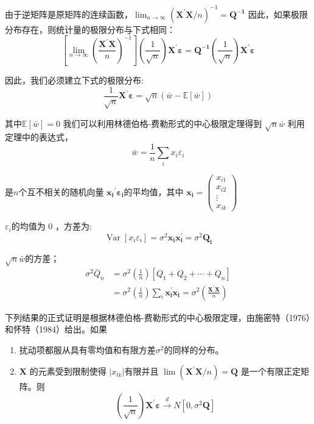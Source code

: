 由于逆矩阵是原矩阵的连续函数，$ \lim _{n \rightarrow \infty}\left(  \boldsymbol{X^{\prime} X} / n\right)^{-1}=  \boldsymbol{Q^{-1}} $ 
因此，如果极限分布存在，则统计量的极限分布与下式相同：
\begin{equation}
    \left[\lim _{n \rightarrow \infty}\left(\frac{  \boldsymbol{X^{\prime} X} }{n}\right)^{-1}\right]
    \left(\frac{1}{\sqrt{n}}\right)  \boldsymbol{ X^{\prime} \varepsilon } = \boldsymbol{ Q^{-1} } \left(\frac{1}{\sqrt{n}}\right) \boldsymbol{X^{\prime} \varepsilon }
    \label{eq 7.2.5}
\end{equation}

因此，我们必须建立下式的极限分布:
$$ \frac{1}{\sqrt{n}} \boldsymbol{X^{\prime} \varepsilon} = \sqrt{n}(\bar{w}-\mathbb{E}[\bar{w}]) $$

其中$ \mathbb{E} [\bar{w}]=0 $ 我们可以利用林德伯格-费勒形式的中心极限定理得到 $ \sqrt{n} \bar{w} $ 利用定理中的表达式，
$$ \bar{w}=\frac{1}{n} \sum_{i} x_{i} \varepsilon_{i} $$

是$ n $个互不相关的随机向量 $ \boldsymbol{{x_{i}}^{\prime} \varepsilon_{i}} $的平均值，其中
$ \boldsymbol{x_{i}}=\left(\begin{array}{c}
            x_{i 1} \\
            x_{i 2} \\
            \vdots \\
            x_{i k}
    \end{array}\right) $

  $ \varepsilon_{i} $的均值为 0 ，方差为:
  $$ \operatorname{Var}\left[x_{i} \varepsilon_{i}\right]=\sigma^{2} \boldsymbol{x_{i} x_{i}^{\prime}} =\sigma^{2} \boldsymbol{Q_{i}} $$

 $ \sqrt{n} \bar{w} $的方差；
 $$ \begin{aligned}
    \sigma^{2} \bar{Q}_{n} &=\sigma^{2}\left(\frac{1}{n}\right)\left[Q_{1}+Q_{2}+\cdots+Q_{n}\right] \\
    &=\sigma^{2}\left(\frac{1}{n}\right) \sum_{i} \boldsymbol{ x_{i}^{\prime} x_{i} } = \sigma^{2}\left(\frac{\boldsymbol{X^{\prime} X}}{n}\right)
    \end{aligned} $$ 

    下列结果的正式证明是根据林德伯格-费勒形式的中心极限定理，由施密特（1976）和怀特（1984）给出。如果
    \begin{enumerate}
        \item 扰动项都服从具有零均值和有限方差$ \sigma ^{2} $的同样的分布。
        \item $ \boldsymbol{X} $ 的元素受到限制使得 $ \left|x_{t k}\right| $有限并且 $ \lim \left( \boldsymbol{ X^{\prime} X } / n\right) = \boldsymbol{Q} $ 
        是一个有限正定矩阵。则
        \begin{equation}
            \left(\frac{1}{\sqrt{n}}\right) \boldsymbol{X^{\prime} \varepsilon} \stackrel{d}{\longrightarrow} N\left[0, \sigma^{2} \boldsymbol{Q} \right]
        \end{equation}
    \end{enumerate}

